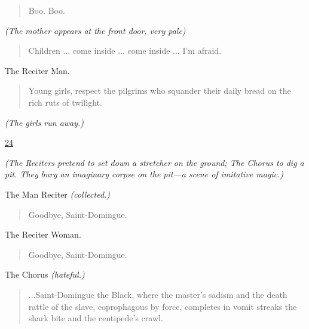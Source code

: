 \documentclass[letterpaper,article,12pt,oneside,notitlepage]{memoir}
\begin{document}
\begin{verse}
\hspace{1cm} Boo. Boo. \\
\end{verse}

\textit{(The mother appears at the front door, very pale)}

\begin{verse}
\indent Children ... come inside ... come inside ... I'm afraid. \\
\end{verse}

\begin{center}The Reciter Man.\end{center}

\begin{verse}
\indent Young girls, respect the pilgrims who squander their daily bread on the rich ruts of twilight. \\
\end{verse}

\textit{(The girls run away.)}

\clearpage

\href{http://cesaire.elotroalex.com/chiens/chiens/p024.html}{24}

\textit{(The Reciters pretend to set down a stretcher on the ground; The Chorus to dig a pit. They bury an imaginary corpse on the pit—a scene of imitative magic.)}

\begin{center}The Man Reciter \textit{(collected.)}\end{center}

\begin{verse}
\hspace{1cm} Goodbye, Saint-Domingue. \\
\end{verse}

\begin{center}The Reciter Woman.\end{center}

\begin{verse}
\hspace{1cm} Goodbye, Saint-Domingue. \\
\end{verse}

\begin{center}The Chorus \textit{(hateful.)}\end{center}

\begin{verse}
\indent ...Saint-Domingue the Black, where the master's sadism and the death rattle of the slave, coprophagous by force, completes in vomit streaks the shark bite and the centipede's crawl. \\
\end{verse}
\end{document}
